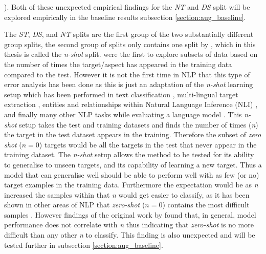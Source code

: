 \citet{aug_wang-etal-2017-tdparse}). Both of these unexpected empirical findings for the \textit{NT} and \textit{DS} split will be explored empirically in the baseline results subsection \ref{section:aug_baseline}.

The \textit{ST}, \textit{DS}, and \textit{NT} splits are the first group of the two substantially different group splits, the second group of splits only contains one split by \citet{aug_yang2018multi}, which in this thesis is called the \textit{n-shot} split. \citet{aug_yang2018multi} were the first to explore subsets of data based on the number of times the target/aspect has appeared in the training data compared to the test. However it is not the first time in NLP that this type of error analysis has been done as this is just an adaptation of the \textit{n-shot} learning setup which has been performed in text classification \citep{aug_yu-etal-2018-diverse}, multi-lingual target extraction \citep{aug_jebbara-cimiano-2019-zero}, entities and relationships within Natural Language Inference (NLI) \citep{aug_levy-etal-2017-zero}, and finally many other NLP tasks while evaluating a language model \citep{aug_radford2019language}. This \textit{n-shot} setup takes the test and training datasets and finds the number of times (\textit{n}) the target in the test dataset appears in the training. Therefore the subset of \textit{zero shot} ($n=0$) targets would be all the targets in the test that never appear in the training dataset. The \textit{n-shot} setup allows the method to be tested for its ability to generalise to unseen targets, and its capability of learning a new target. Thus a model that can generalise well should be able to perform well with as few (or no) target examples in the training data. Furthermore the expectation would be as \textit{n} increased the samples within that \textit{n} would get easier to classify, as it has been shown in other areas of NLP that \textit{zero-shot} ($n=0$) contains the most difficult samples \citep{aug_jebbara-cimiano-2019-zero}. However findings of the original work by \citet{aug_yang2018multi} found that, in general, model performance does not correlate with \textit{n} thus indicating that \textit{zero-shot} is no more difficult than any other \textit{n} to classify. This finding is also unexpected and will be tested further in subsection \ref{section:aug_baseline}.

